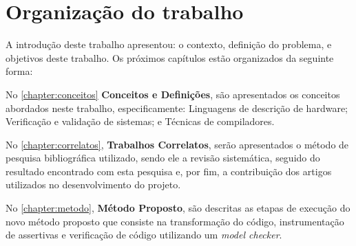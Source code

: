 % 


\section{Organização do trabalho}
A introdução deste trabalho apresentou: o contexto, definição do problema, e objetivos deste trabalho. Os próximos capítulos estão organizados da seguinte forma:

\par
No \autoref{chapter:conceitos} \textbf{Conceitos e Definições}, são apresentados os conceitos abordados neste trabalho, especificamente: Linguagens de descrição de hardware; Verificação e validação de sistemas; e Técnicas de compiladores.

\par
No \autoref{chapter:correlatos}, \textbf{Trabalhos Correlatos}, serão apresentados o método de pesquisa bibliográfica utilizado, sendo ele a revisão sistemática, seguido do resultado encontrado com esta pesquisa e, por fim, a contribuição dos artigos utilizados no desenvolvimento do projeto. 

\par
No \autoref{chapter:metodo}, \textbf{Método Proposto}, são descritas as etapas de execução do novo método proposto que consiste na transformação do código, instrumentação de assertivas e verificação de código utilizando um \textit{model checker}.


